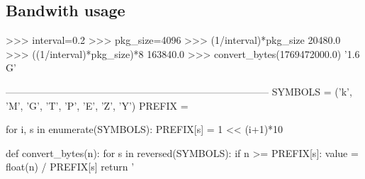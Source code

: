 \subsection{Bandwith usage}
>>> interval=0.2
>>> pkg_size=4096
>>> (1/interval)*pkg_size
20480.0
>>> ((1/interval)*pkg_size)*8
163840.0
>>> convert_bytes(1769472000.0)
'1.6 G'


--------------------------------------------------------------------------------
SYMBOLS = ('k', 'M', 'G', 'T', 'P', 'E', 'Z', 'Y')
PREFIX = {}

for i, s in enumerate(SYMBOLS):
    PREFIX[s] = 1 << (i+1)*10

def convert_bytes(n):
    for s in reversed(SYMBOLS):
        if n >= PREFIX[s]:
            value = float(n) / PREFIX[s] 
            return '%
